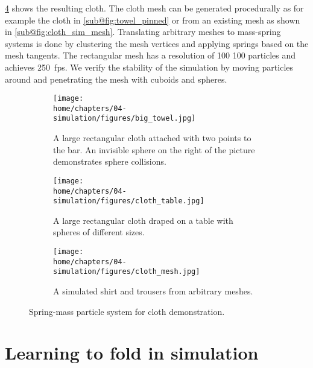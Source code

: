 \documentclass[\home/main.tex]{subfiles}
\begin{document}
\cref{fig:cloth_sim_result} shows the resulting cloth. The cloth mesh can be generated procedurally as for example the cloth in \cref{sub@fig:towel_pinned} or from an existing mesh as shown in \cref{sub@fig:cloth_sim_mesh}. Translating arbitrary meshes to mass-spring systems is done by clustering the mesh vertices and applying springs based on the mesh tangents. The rectangular mesh has a resolution of 100\,\texttimes\,100 particles and achieves \qty{250}{fps}. We verify the stability of the simulation by moving particles around and penetrating the mesh with cuboids and spheres.

\begin{figure}[htpb]{}
    \centering
    \begin{subfigure}[b]{0.95\textwidth}
        \centering
        \texttt{[image: \\home/chapters/04-simulation/figures/big\_towel.jpg]}
        \caption[Simulated, pinned rectangular cloth.]{A large rectangular cloth attached with two points to the bar. An invisible sphere on the right of the picture demonstrates sphere collisions.}
        \label{fig:towel_pinned}
    \end{subfigure}
    \begin{subfigure}[b]{0.95\textwidth}
        \centering
        \texttt{[image: \\home/chapters/04-simulation/figures/cloth\_table.jpg]}
        \caption[Simulated rectangular cloth on table.]{A large rectangular cloth draped on a table with spheres of different sizes.}
        \label{fig:towel_table}
    \end{subfigure}
    \begin{subfigure}[b]{0.95\textwidth}
        \centering
        \texttt{[image: \\home/chapters/04-simulation/figures/cloth\_mesh.jpg]}
        \caption[Simulated cloth meshes.]{A simulated shirt and trousers from arbitrary meshes.}
        \label{fig:cloth_sim_mesh}
    \end{subfigure}

    \caption[Spring-mass particle system for cloth demonstration.]{Spring-mass particle system for cloth demonstration.}
    \label{fig:cloth_sim_result}
\end{figure}

\section{Learning to fold in simulation}
\end{document}
